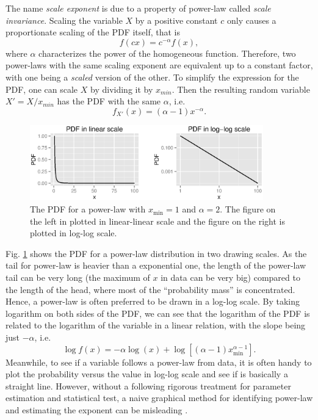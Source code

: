 The name \textit{scale exponent} is due to a property of power-law called \textit{scale invariance}. Scaling the variable $ X $ by a positive constant $ c $ only causes a proportionate scaling of the PDF itself, that is 
\begin{equation}
f(cx) = c^{-\alpha} f(x),
\end{equation}
where $ \alpha $ characterizes the power of the homogeneous function. Therefore, two power-laws with the same scaling exponent are equivalent up to a constant factor, with one being a \textit{scaled} version of the other. To simplify the expression for the PDF, one can scale $ X $ by dividing it by $ x_{min} $. Then the resulting random variable $ X' = X/x_{min} $ has the PDF with the same $ \alpha $, i.e.
\begin{equation}
f_{X'}(x) = (\alpha-1) x^{-\alpha}.
\end{equation}

\begin{figure}[!h]
\begin{center}
\includegraphics[width=0.9\textwidth]{figures/ch2_powerlaw_pdf.eps}
\caption{The PDF for a power-law with $ x_{\min}=1 $ and $ \alpha=2 $. The figure on the left in plotted in linear-linear scale and the figure on the right is plotted in log-log scale.}
\label{fig:ch2_powerlaw_pdf}
\end{center}
\end{figure}

Fig. \ref{fig:ch2_powerlaw_pdf} shows the PDF for a power-law distribution in two drawing scales. As the tail for power-law is heavier than a exponential one, the length of the power-law tail can be very long (the maximum of $ x $ in data can be very big) compared to the length of the head, where most of the ``probability mass'' is concentrated. Hence, a power-law is often preferred to be drawn in a log-log scale. By taking logarithm on both sides of the PDF, we can see that the logarithm of the PDF is related to the logarithm of the variable in a linear relation, with the slope being just $ -\alpha $, i.e.
\begin{equation}
\log f(x) = -\alpha	\log (x) + \log[(\alpha-1) x_{\min}^{\alpha-1}].
\end{equation}
Meanwhile, to see if a variable follows a power-law from data, it is often handy to plot the probability versus the value in log-log scale and see if is basically a straight line. However, without a following rigorous treatment for parameter estimation and statistical test, a naive graphical method for identifying power-law and estimating the exponent can be misleading \cite{Clauset2009}. 


